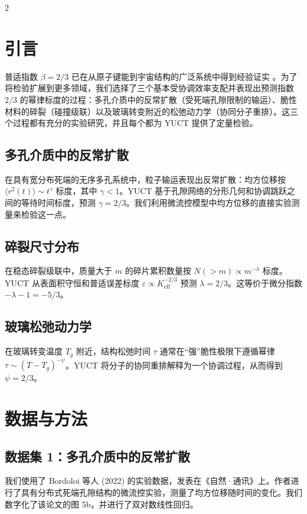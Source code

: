 \documentclass[11pt,a4paper]{article}
\newcommand{\eps}{\varepsilon}
\newcommand{\Keff}{K_{\mathrm{eff}}}
\newcommand{\betaf}{\beta}
\begin{document}
	\vspace{0.4cm}
	\vspace*{-\baselineskip}
	\begin{multicols}{2}
		
		\section{引言}
		
		普适指数 \(\betaf = 2/3\) 已在从原子键能到宇宙结构的广泛系统中得到经验证实 \cite{AppendixY, AppendixL, AppendixC, AppendixG}。为了将检验扩展到更多领域，我们选择了三个基本受协调效率支配并表现出预测指数 \(2/3\) 的幂律标度的过程：多孔介质中的反常扩散（受死端孔隙限制的输运）、脆性材料的碎裂（碰撞级联）以及玻璃转变附近的松弛动力学（协同分子重排）。这三个过程都有充分的实验研究，并且每个都为 YUCT 提供了定量检验。
		
		\subsection{多孔介质中的反常扩散}
		在具有宽分布死端的无序多孔系统中，粒子输运表现出反常扩散：均方位移按 \(\langle r^2(t) \rangle \sim t^{\gamma}\) 标度，其中 \(\gamma < 1\)。YUCT 基于孔隙网络的分形几何和协调跳跃之间的等待时间标度，预测 \(\gamma = 2/3\)。我们利用微流控模型中均方位移的直接实验测量来检验这一点。
		
		\subsection{碎裂尺寸分布}
		在稳态碎裂级联中，质量大于 \(m\) 的碎片累积数量按 \(N(>m) \propto m^{-\lambda}\) 标度。YUCT 从表面积守恒和普适误差标度 \(\eps \propto \Keff^{-2/3}\) 预测 \(\lambda = 2/3\)。这等价于微分指数 \(-\lambda - 1 = -5/3\)。
		
		\subsection{玻璃松弛动力学}
		在玻璃转变温度 \(T_g\) 附近，结构松弛时间 \(\tau\) 通常在“强”脆性极限下遵循幂律 \(\tau \sim (T - T_g)^{-\psi}\)。YUCT 将分子的协同重排解释为一个协调过程，从而得到 \(\psi = 2/3\)。
		
		\section{数据与方法}
		
		\subsection{数据集 1：多孔介质中的反常扩散}
		我们使用了 Bordoloi 等人 (2022) \cite{Bordoloi2022} 的实验数据，发表在《自然·通讯》上。作者进行了具有分布式死端孔隙结构的微流控实验，测量了均方位移随时间的变化。我们数字化了该论文的图 5b，并进行了双对数线性回归。
		

\end{multicols}
\end{document}
